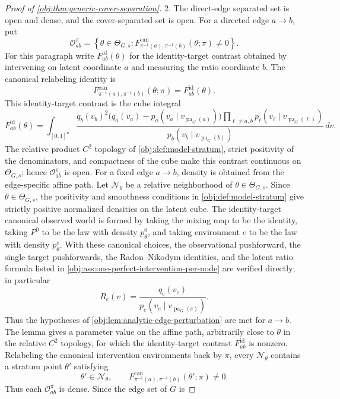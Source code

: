 \documentclass[11pt]{article}
\begin{document}
\begin{proof}[Proof of \cref{obj:thm:generic-cover-separation}]
2.  The direct-edge separated set is open and dense, and the cover-separated set
is open.  For a directed edge \(a\to b\), put
\[
\mathcal O^\pi_{ab}
=
\left\{
\theta\in\Theta_{G,s}:
F^{\mathrm{can}}_{\pi^{-1}(a),\pi^{-1}(b)}(\theta;\pi)\ne0
\right\}.
\]
For this paragraph write \(F^{\mathrm{id}}_{ab}(\theta)\) for the
identity-target contrast obtained by intervening on latent coordinate \(a\) and
measuring the ratio coordinate \(b\).  The canonical relabeling identity is
\[
F^{\mathrm{can}}_{\pi^{-1}(a),\pi^{-1}(b)}(\theta;\pi)
=
F^{\mathrm{id}}_{ab}(\theta).
\]
This identity-target contrast is the cube integral
\[
F^{\mathrm{id}}_{ab}(\theta)
=
\int_{[0,1]^n}
\frac{
q_b(v_b)^2\bigl(q_a(v_a)-p_a(v_a\mid v_{\operatorname{pa}_G(a)})\bigr)
\prod_{\ell\ne a,b}p_\ell(v_\ell\mid v_{\operatorname{pa}_G(\ell)})
}
{p_b(v_b\mid v_{\operatorname{pa}_G(b)})}
\,dv .
\]
The relative product \(C^2\) topology of \cref{obj:def:model-stratum},
strict positivity of the denominators, and compactness of the cube make this
contrast continuous on \(\Theta_{G,s}\); hence \(\mathcal O^\pi_{ab}\) is open.
For a fixed edge \(a\to b\), density is obtained from the edge-specific affine
path.  Let \(\mathcal N_\theta\) be a relative neighborhood of
\(\theta\in\Theta_{G,s}\).  Since \(\theta\in\Theta_{G,s}\), the positivity and smoothness conditions in
\cref{obj:def:model-stratum} give strictly positive normalized densities on the
latent cube.  The identity-target canonical observed world is formed by taking
the mixing map to be the identity, taking \(P^0\) to be the law with density
\(p^0_\theta\), and taking environment \(e\) to be the law with density
\(p^e_\theta\).  With these canonical choices, the observational pushforward,
the single-target pushforwards, the Radon--Nikodym identities, and the latent
ratio formula listed in \cref{obj:ass:one-perfect-intervention-per-node} are
verified directly; in particular
\[
R_e(v)=
\frac{q_e(v_e)}{p_e(v_e\mid v_{\operatorname{pa}_G(e)})}.
\]
Thus the hypotheses of \cref{obj:lem:analytic-edge-perturbation} are met for
\(a\to b\).  The lemma gives a parameter value on the affine path, arbitrarily
close to \(\theta\) in the relative \(C^2\) topology, for which the
identity-target contrast \(F^{\mathrm{id}}_{ab}\) is nonzero.  Relabeling the
canonical intervention environments back by \(\pi\), every \(\mathcal N_\theta\)
contains a stratum point \(\theta'\) satisfying
\[
\theta'\in\mathcal N_\theta,
\qquad
F^{\mathrm{can}}_{\pi^{-1}(a),\pi^{-1}(b)}(\theta';\pi)\ne0.
\]
Thus each \(\mathcal O^\pi_{ab}\) is dense.  Since the edge set of \(G\) is

\end{proof}
\end{document}

